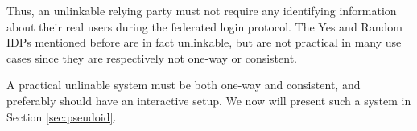 \documentclass{llncs}
\begin{document}
Thus, an unlinkable relying party must not require any identifying
information about their real users during the federated login
protocol. The Yes and Random IDPs mentioned before are in fact
unlinkable, but are not practical in many use cases since they are
respectively not one-way or consistent.

A practical unlinable system must be both one-way and consistent, and
preferably should have an interactive setup. We now will present such
a system in Section \ref{sec:pseudoid}.




\end{document}
